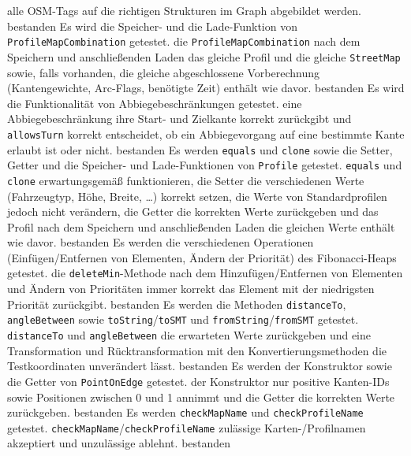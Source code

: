 \documentclass[a4paper, 11pt]{article}
\newcommand{\code}[1]{\texttt{#1}}
\begin{document}
\begin{itemize}
     {alle OSM-Tags auf die richtigen Strukturen im Graph abgebildet werden.}
     {bestanden}
     {Es wird die Speicher- und die Lade-Funktion von \code{Pro\-file\-Map\-Com\-bi\-na\-tion} getestet.}
     {die \code{ProfileMapCombination} nach dem Speichern und anschließenden Laden das gleiche Profil und die gleiche \code{StreetMap} sowie, falls vorhanden, die gleiche abgeschlossene Vorberechnung (Kantengewichte, Arc-Flags, benötigte Zeit) enthält wie davor.}
     {bestanden}
     {Es wird die Funktionalität von Abbiegebeschränkungen getestet.}
     {eine Abbiegebeschränkung ihre Start- und Zielkante korrekt zurückgibt und \code{allowsTurn} korrekt entscheidet, ob ein Abbiegevorgang auf eine bestimmte Kante erlaubt ist oder nicht.}
     {bestanden}
     {Es werden \code{equals} und \code{clone} sowie die Setter, Getter und die Speicher- und Lade-Funktionen von \code{Profile} getestet.}
     {\code{equals} und \code{clone} erwartungsgemäß funktionieren, die Setter die verschiedenen Werte (Fahrzeugtyp, Höhe, Breite, \dots) korrekt setzen, die Werte von Standardprofilen jedoch nicht verändern, die Getter die korrekten Werte zurückgeben und das Profil nach dem Speichern und anschließenden Laden die gleichen Werte enthält wie davor.}
     {bestanden}
     {Es werden die verschiedenen Operationen (Einfügen/Entfernen von Elementen, Ändern der Priorität) des Fibonacci-Heaps getestet.}
     {die \code{deleteMin}-Methode nach dem Hinzufügen/Entfernen von Elementen und Ändern von Prioritäten immer korrekt das Element mit der niedrigsten Priorität zurückgibt.}
     {bestanden}
     {Es werden die Methoden \code{distanceTo}, \code{angleBetween} sowie \code{toString}/\code{toSMT} und \code{fromString}/\code{fromSMT} getestet.}
     {\code{distanceTo} und \code{angleBetween} die erwarteten Werte zurückgeben und eine Transformation und Rücktransformation mit den Konvertierungsmethoden die Testkoordinaten unverändert lässt.}
     {bestanden}
     {Es werden der Konstruktor sowie die Getter von \code{PointOnEdge} getestet.}
     {der Konstruktor nur positive Kanten-IDs sowie Positionen zwischen 0 und 1 annimmt und die Getter die korrekten Werte zurückgeben.}
     {bestanden}
     {Es werden \code{checkMapName} und \code{checkProfileName} getestet.}
     {\code{checkMapName}/\code{checkProfileName} zulässige \mbox{Karten-/}\hspace{0pt}Profilnamen akzeptiert und unzulässige ablehnt.}
     {bestanden}
\end{itemize}
\end{document}
